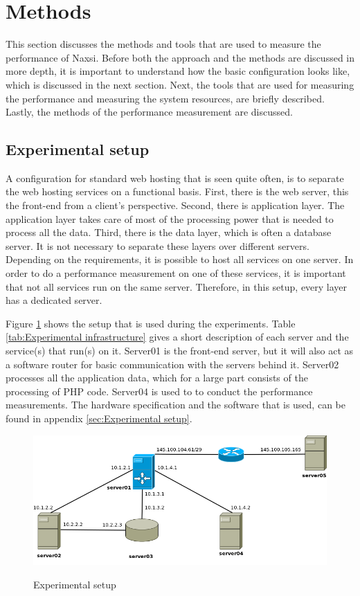 \documentclass[Methods]{subfiles}
\begin{document}
\section{Methods}
\label{sec:Methods}

This section discusses the methods and tools that are used to measure the performance of Naxsi. Before both the approach and the methods are discussed in more depth, it is important to understand how the basic configuration looks like, which is discussed in the next section. Next, the tools that are used for measuring the performance and measuring the system resources, are briefly described. Lastly, the methods of the performance measurement are discussed.

\subsection{Experimental setup}
A configuration for standard web hosting that is seen quite often, is to separate the web hosting services on a functional basis. First, there is the web server, this the front-end from a client's perspective. Second, there is application layer. The application layer takes care of most of the processing power that is needed to process all the data. Third, there is the data layer, which is often a database server. It is not necessary to separate these layers over different servers. Depending on the requirements, it is possible to host all services on one server. In order to do a performance measurement on one of these services, it is important that not all services run on the same server. Therefore, in this setup, every layer has a dedicated server.

Figure \ref{fig:Experimental setup} shows the setup that is used during the experiments. Table \ref{tab:Experimental infrastructure} gives a short description of each server and the service(s) that run(s) on it. Server01 is the front-end server, but it will also act as a software router for basic communication with the servers behind it. Server02 processes all the application data, which for a large part consists of the processing of PHP code. Server04 is used to to conduct the performance measurements. The hardware specification and the software that is used, can be found in appendix \ref{sec:Experimental setup}.

\begin{figure}[H]
\caption{Experimental setup}
\centering
\includegraphics[scale=0.4] {images/infrastructure.png}
\label{fig:Experimental setup}
\end{figure}
\end{document}
